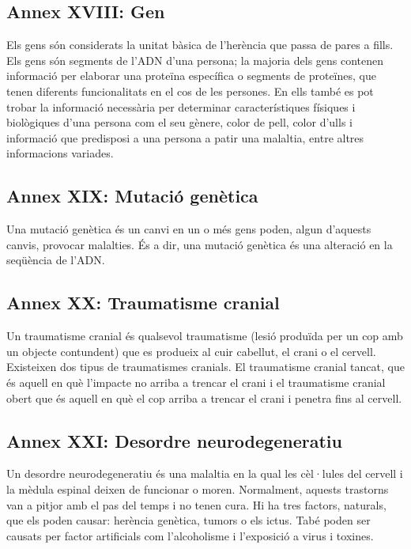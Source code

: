 \documentclass[a4paper,12pt]{article}
\begin{document}
\subsection*{Annex XVIII: Gen}
Els gens són considerats la unitat bàsica de l'herència que passa de pares a fills. Els gens són segments de l'ADN d'una persona; la majoria dels gens contenen informació per elaborar una proteïna específica o segments de proteïnes, que tenen diferents funcionalitats en el cos de les persones. En ells també es pot trobar la informació necessària per determinar característiques físiques i biològiques d'una persona com el seu gènere, color de pell, color d'ulls i informació que predisposi a una persona a patir una malaltia, entre altres informacions variades.
\subsection*{Annex XIX: Mutació genètica}
Una mutació genètica és un canvi en un o més gens poden, algun d'aquests canvis, provocar malalties. És a dir, una mutació genètica és una alteració en la seqüència de l'ADN.
\subsection*{Annex XX: Traumatisme cranial}
Un traumatisme cranial és qualsevol traumatisme (lesió produïda per un cop amb un objecte contundent)
 que es produeix al cuir cabellut, el crani o el cervell. Existeixen dos tipus de traumatismes cranials. El traumatisme cranial tancat, que és aquell en què l'impacte no arriba a trencar el crani i el traumatisme cranial obert que és aquell en què el cop arriba a trencar el crani i penetra fins al cervell.
\subsection*{Annex XXI: Desordre neurodegeneratiu}
Un desordre neurodegeneratiu és una malaltia en la qual les cèl·lules del cervell i la mèdula espinal deixen de funcionar o moren. Normalment, aquests trastorns van a pitjor amb el pas del temps i no tenen cura. Hi ha tres factors, naturals, que els poden causar: herència genètica, tumors o els ictus. Tabé poden ser causats per factor artificials com l'alcoholisme i l'exposició a virus i toxines.
\end{document}
